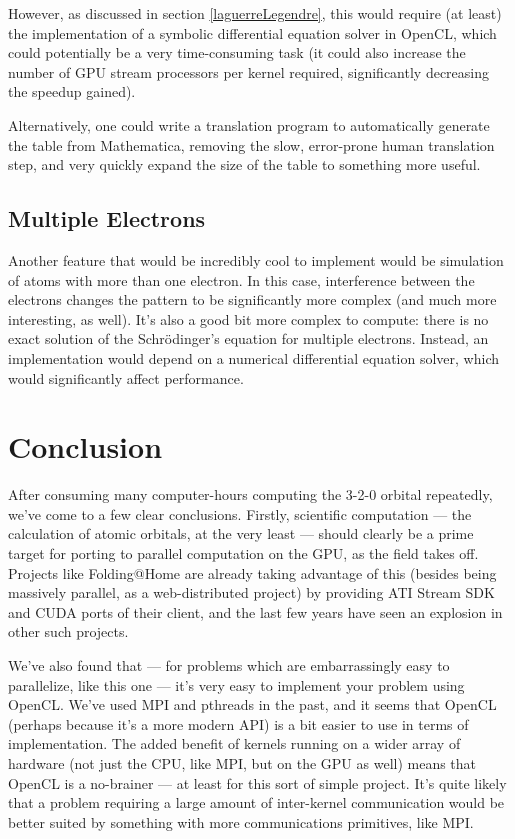 \documentclass{acmsiggraph}
\begin{document}
However, as discussed in section \ref{laguerreLegendre}, this would require (at least) the implementation of a symbolic differential equation solver in OpenCL, which could potentially be a very time-consuming task (it could also increase the number of GPU stream processors per kernel required, significantly decreasing the speedup gained).

Alternatively, one could write a translation program to automatically generate the table from Mathematica, removing the slow, error-prone human translation step, and very quickly expand the size of the table to something more useful.

\subsection{Multiple Electrons}

Another feature that would be incredibly cool to implement would be simulation of atoms with more than one electron. In this case, interference between the electrons changes the pattern to be significantly more complex (and much more interesting, as well). It's also a good bit more complex to compute: there is no exact solution of the Schr\"{o}dinger's equation for multiple electrons. Instead, an implementation would depend on a numerical differential equation solver, which would significantly affect performance.

\section{Conclusion}

After consuming many computer-hours computing the 3-2-0 orbital repeatedly, we've come to a few clear conclusions. Firstly, scientific computation --- the calculation of atomic orbitals, at the very least --- should clearly be a prime target for porting to parallel computation on the GPU, as the field takes off. Projects like Folding@Home are already taking advantage of this (besides being massively parallel, as a web-distributed project) by providing ATI Stream SDK and CUDA ports of their client, and the last few years have seen an explosion in other such projects.

We've also found that --- for problems which are embarrassingly easy to parallelize, like this one --- it's very easy to implement your problem using OpenCL. We've used MPI and pthreads in the past, and it seems that OpenCL (perhaps because it's a more modern API) is a bit easier to use in terms of implementation. The added benefit of kernels running on a wider array of hardware (not just the CPU, like MPI, but on the GPU as well) means that OpenCL is a no-brainer --- at least for this sort of simple project. It's quite likely that a problem requiring a large amount of inter-kernel communication would be better suited by something with more communications primitives, like MPI.
\end{document}
